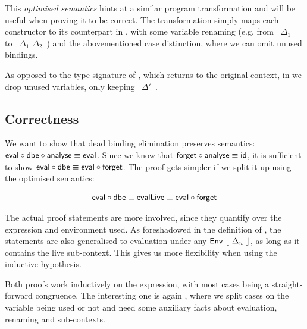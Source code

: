 \documentclass[11pt,a4paper]{article}
\newcommand{\AgdaFloor}[1]{\AgdaFunction{$\lfloor$}\ #1\ \AgdaFunction{$\rfloor$}}
\begin{document}
\CodeLiveEvalLive

This \emph{optimised semantics} hints at a similar program transformation
and will be useful when proving it to be correct.
The transformation simply maps each constructor to its counterpart in ,
with some variable renaming
(e.g. from \AgdaFloor{$\Delta_1$} to \AgdaFloor{$\Delta_1$ \AgdaFunction{$\cup$} $\Delta_2$})
and the abovementioned case distinction,
where we can omit unused bindings.

\CodeLiveDbe
\CodeLiveRestrictedRefSignature

As opposed to the type signature of ,
which returns to the original context,
in  we drop unused variables, only keeping \AgdaFloor{$\Delta'$}.


\subsection{Correctness}

We want to show that dead binding elimination preserves semantics:
$\AgdaFunction{eval} \circ \AgdaFunction{dbe} \circ \AgdaFunction{analyse} \equiv \AgdaFunction{eval}$.
Since we know that
$\AgdaFunction{forget} \circ \AgdaFunction{analyse} \equiv \AgdaFunction{id}$,
it is sufficient to show
$\AgdaFunction{eval} \circ \AgdaFunction{dbe} \equiv \AgdaFunction{eval} \circ \AgdaFunction{forget}$.
The proof gets simpler if we split it up using the optimised semantics:

\begin{align*}
  \AgdaFunction{eval} \circ \AgdaFunction{dbe}
    \equiv \AgdaFunction{evalLive}
    \equiv \AgdaFunction{eval} \circ \AgdaFunction{forget}
\end{align*}

The actual proof statements are more involved,
since they quantify over the expression and environment used.
As foreshadowed in the definition of , the statements are also generalised
to evaluation under any $\AgdaDatatype{Env}\ \AgdaFloor{\Delta_u}$,
as long as it contains the live sub-context.
This gives us more flexibility when using the inductive hypothesis.

\CodeLiveDbeCorrectSignature
\CodeLiveEvalLiveCorrectSignature

Both proofs work inductively on the expression, with most cases being a straight-forward congruence.
The interesting one is again ,
where we split cases on the variable being used or not
and need some auxiliary facts about evaluation, renaming and sub-contexts.
\end{document}
